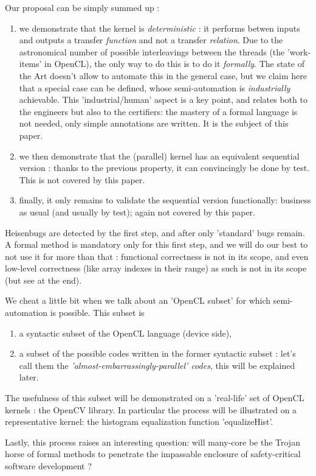 \documentclass[a4paper,10pt]{article} %
\begin{document}
Our proposal can be simply summed up :
\begin{enumerate}
\item we demonstrate that the kernel is \emph{deterministic} : it performs betwen inputs and outputs a transfer \emph{function} and not a transfer \emph{relation}.
Due to the astronomical number of possible interleavings between the threads (the 'work-items' in OpenCL), the only way to do this is to do it \emph{formally}.
The state of the Art doesn't allow to automate this in the general case, but we claim here that a special case can be defined, whose semi-automation is \emph{industrially} achievable.
This 'industrial/human' aspect is a key point, and relates both to the engineers but also to the certifiers:
the mastery of a formal language is not needed, only simple annotations are written. It is the subject of this paper.
\item we then demonstrate that the (parallel) kernel has an equivalent sequential version : thanks to the previous property, it can convincingly be done by test. This is not covered by this paper.
\item finally, it only remains to validate the sequential version functionally: business as usual (and usually by test); again not covered by this paper.
\end{enumerate}
Heisenbugs are detected by the first step, and after only 'standard' bugs remain.
A formal method is mandatory only for this first step, and we will do our best to not use it for more than that :
functional correctness is not in its scope, and even low-level correctness (like array indexes in their range) as such is not in its scope (but see at the end).

We cheat a little bit when we talk about an  'OpenCL subset' for which semi-automation is possible. This subset is
\begin{enumerate}
\item a syntactic subset of the OpenCL language (device side),
\item a subset of the possible codes written in the former syntactic subset : let's call them the \emph{'almost-embarrassingly-parallel' codes}, this will be explained later.
\end{enumerate}
The usefulness of this subset will be demonstrated on a 'real-life' set of OpenCL kernels : the OpenCV library.
In particular the process will be illustrated on a representative kernel:  the histogram equalization function 'equalizeHist'.

Lastly, this process raises an interesting question: will many-core be the Trojan horse of formal methods to penetrate the impassable enclosure of safety-critical software development ?
\end{document}
